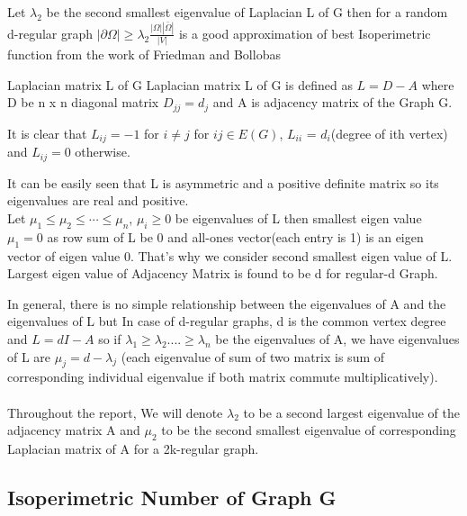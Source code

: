 \documentclass[oneside]{book}
\begin{document}
	Let $\lambda_{2}$ be the second smallest eigenvalue of Laplacian L of G then for a random d-regular graph $|\partial \Omega| \geq \lambda_{2} \frac{|\Omega||\bar{\Omega}|}{|V|}$  is a good approximation of best Isoperimetric function from the work of Friedman and Bollobas  \par 
	
	
	{Laplacian matrix L of G }
	\label{ss:22}
	Laplacian matrix L of G is defined as  $L = D - A$ where  D be n x n diagonal matrix $D_{jj} = d_{j}$ and A is adjacency matrix of the Graph G.\par
	
	
	
	It is clear that   $L_{ij} = -1$ for $i\neq j$  for $ij\in E(G)$,  $L_{ii}$ = $d_i$(degree of ith vertex) and   $L_{ij} = 0$ otherwise.\par
	
	It can be easily seen that L is asymmetric and a positive definite  matrix so its eigenvalues are real and positive. \\
	
	Let $\mu_{1} \leq \mu_{2} \leq \cdots \leq \mu_{n}$, $\mu_{i} \geq 0$  be  eigenvalues of L then smallest eigen value $\mu_{1} = 0$ as row sum of L  be 0 and all-ones vector(each entry is 1) is an eigen vector of eigen value 0. That's why we consider second smallest eigen value of L. Largest eigen value of Adjacency Matrix is found to be d for regular-d Graph. \par
	
	
	
	
	In general, there is no simple relationship between the eigenvalues of
	A and the eigenvalues of L but In case of d-regular graphs, d is the
	common vertex degree and $L = dI - A$  so if $\lambda_{1} \geq \lambda_{2}....\geq \lambda_{n}$  be the eigenvalues of A, we have eigenvalues of L are $\mu_{j} = d - \lambda_{j}$ (each eigenvalue of sum of two matrix is sum of corresponding  individual eigenvalue if both matrix commute multiplicatively). \\\\
	Throughout the report, We will denote $\lambda_{2} $ to be a second largest eigenvalue of the adjacency matrix A and $\mu_{2}$ to be the second smallest eigenvalue of corresponding Laplacian matrix of A for a 2k-regular graph.  
	
	
	
	\subsection{Isoperimetric Number of Graph G} \label{ss:23}
	
\end{document}
